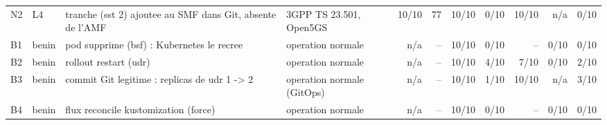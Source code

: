 \begin{table}[t]
\begin{tabular}{llp{3.6cm}p{2.4cm}rrrrrrr}
N2 & L4 & tranche (sst 2) ajoutee au SMF dans Git, absente de l'AMF & 3GPP TS 23.501, Open5GS & 10/10 & 77 & 10/10 & 0/10 & 10/10 & n/a & 0/10 \\
B1 & benin & pod supprime (bsf) : Kubernetes le recree & operation normale & n/a & -- & 10/10 & 0/10 & -- & 0/10 & 0/10 \\
B2 & benin & rollout restart (udr) & operation normale & n/a & -- & 10/10 & 4/10 & 7/10 & 0/10 & 2/10 \\
B3 & benin & commit Git legitime : replicas de udr 1 -> 2 & operation normale (GitOps) & n/a & -- & 10/10 & 1/10 & 10/10 & n/a & 3/10 \\
B4 & benin & flux reconcile kustomization (force) & operation normale & n/a & -- & 10/10 & 0/10 & -- & 0/10 & 0/10 \\
\hline
\end{tabular}
\end{table}
